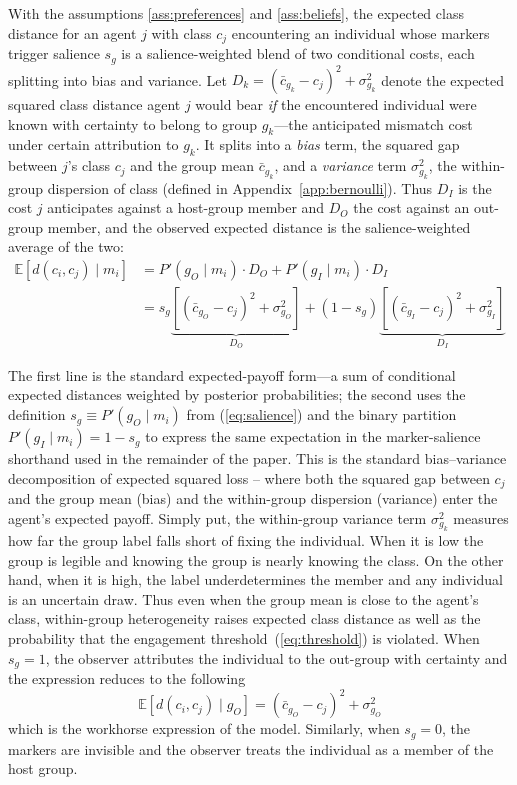 \documentclass[pdflatex,sn-basic]{sn-jnl}
\newcommand{\E}{\mathbb{E}}
\theoremstyle{thmstyleone}
\numberwithin{proposition}{subsection}
\begin{document}
With the assumptions \ref{ass:preferences} and \ref{ass:beliefs}, the expected class distance for an
agent $j$ with class $c_j$ encountering an individual whose markers
trigger salience $s_g$ is a salience-weighted blend of two conditional
costs, each splitting into bias and variance. Let
$D_k = (\bar{c}_{g_k} - c_j)^2 + \sigma_{g_k}^2$ denote the expected
squared class distance agent $j$ would bear \emph{if} the encountered
individual were known with certainty to belong to group $g_k$---the
anticipated mismatch cost under certain attribution to $g_k$. It splits
into a \emph{bias} term, the squared gap between $j$'s class $c_j$ and
the group mean $\bar{c}_{g_k}$, and a \emph{variance} term
$\sigma_{g_k}^2$, the within-group dispersion of class (defined in
Appendix~\ref{app:bernoulli}). Thus $D_I$ is the cost $j$ anticipates
against a host-group member and $D_O$ the cost against an out-group
member, and the observed expected distance is the salience-weighted
average of the two:
\begin{equation}
  \begin{aligned}
  \E[d(c_i, c_j) \mid m_i]
  &= P'(g_O \mid m_i) \cdot D_O + P'(g_I \mid m_i) \cdot D_I \\
  &= s_g \underbrace{\left[(\bar{c}_{g_O} - c_j)^2 + \sigma_{g_O}^2\right]}_{D_O}
  + (1 - s_g) \underbrace{\left[(\bar{c}_{g_I} - c_j)^2 + \sigma_{g_I}^2\right]}_{D_I}
  \end{aligned}
  \label{eq:Ed-salience}
\end{equation}

The first line is the standard expected-payoff form---a sum of
conditional expected distances weighted by posterior probabilities;
the second uses the definition $s_g \equiv P'(g_O \mid m_i)$ from
(\ref{eq:salience}) and the binary partition $P'(g_I \mid m_i) = 1 -
s_g$ to express the same expectation in the marker-salience
shorthand used in the remainder of the paper. This is the standard bias--variance decomposition of expected squared loss -- where both the squared gap between $c_j$ and the group mean (bias) and the within-group dispersion (variance) enter the agent's expected payoff. Simply put, the within-group variance term $\sigma_{g_k}^2$ measures how far the
group label falls short of fixing the individual. When it is low the
group is legible and knowing the group is nearly knowing the class. On the other hand, when it is high, the label underdetermines the member and any individual
is an uncertain draw. Thus even when the group mean
is close to the agent's class, within-group heterogeneity raises
expected class distance as well as the probability that the engagement
threshold~(\ref{eq:threshold}) is violated. When $s_g = 1$, the observer attributes the individual to the out-group with certainty and the expression reduces to the following
\begin{equation}
  \E[d(c_i, c_j) \mid g_O]
  = (\bar{c}_{g_O} - c_j)^2 + \sigma_{g_O}^2
  \label{eq:Ed-group}
\end{equation}
which is the workhorse expression of the model. Similarly, when $s_g = 0$,
the markers are invisible and the observer treats the individual
as a member of the host group.
\end{document}
